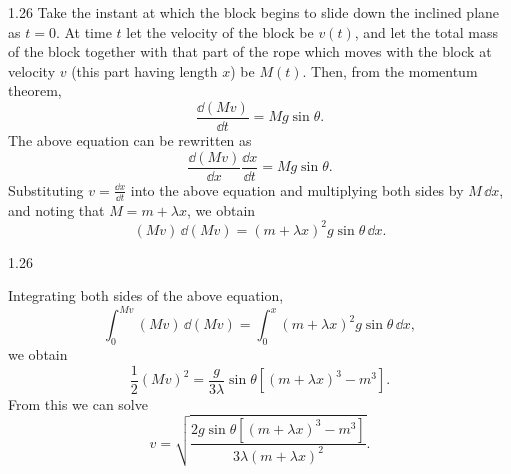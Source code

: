\begin{solution}{1.26}
Take the instant at which the block begins to slide down the inclined plane as $t=0$. At time
$t$ let the velocity of the block be $v(t)$, and let the total mass of the block together with
that part of the rope which moves with the block at velocity $v$ (this part having length $x$)
be $M(t)$. Then, from the momentum theorem,
\begin{equation*}
\frac{\dd(Mv)}{\dd t}=Mg\sin\theta.
\end{equation*}
The above equation can be rewritten as
\begin{equation*}
\frac{\dd(Mv)}{\dd x}\frac{\dd x}{\dd t}=Mg\sin\theta.
\end{equation*}
Substituting $v=\frac{\dd x}{\dd t}$ into the above equation and multiplying both sides by
$M\,\dd x$, and noting that $M=m+\lambda x$, we obtain
\begin{equation*}
(Mv)\,\dd(Mv)=(m+\lambda x)^2g\sin\theta\,\dd x.
\end{equation*}

\begin{figbox}{1.26}
\end{figbox}

Integrating both sides of the above equation,
\begin{equation*}
\int_0^{Mv}(Mv)\,\dd(Mv)=\int_0^x(m+\lambda x)^2g\sin\theta\,\dd x,
\end{equation*}
we obtain
\begin{equation*}
\frac{1}{2}(Mv)^2=\frac{g}{3\lambda}\sin\theta\left[(m+\lambda x)^3-m^3\right].
\end{equation*}
From this we can solve
\begin{equation*}
v=\sqrt{\frac{2g\sin\theta\left[(m+\lambda x)^3-m^3\right]}{3\lambda(m+\lambda x)^2}}.
\end{equation*}
\end{solution}

